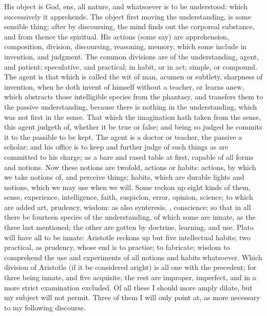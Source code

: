 {His object is God, ens, all nature, and whatsoever is to be understood:
which successively it apprehends. The object first moving the
understanding, is some sensible thing; after by discoursing, the mind
finds out the corporeal substance, and from thence the spiritual. His
actions (some say) are apprehension, composition, division,
discoursing, reasoning, memory, which some include in invention, and
judgment. The common divisions are of the understanding, agent, and
patient; speculative, and practical; in habit, or in act; simple, or
compound. The agent is that which is called the wit of man, acumen or
subtlety, sharpness of invention, when he doth invent of himself
without a teacher, or learns anew, which abstracts those intelligible
species from the phantasy, and transfers them to the passive
understanding, because there is nothing in the understanding,
which was not first in the sense. That which the imagination hath taken
from the sense, this agent judgeth of, whether it be true or false; and
being so judged he commits it to the passible to be kept. The agent is
a doctor or teacher, the passive a scholar; and his office is to keep
and further judge of such things as are committed to his charge; as a
bare and rased table at first, capable of all forms and notions. Now
these notions are twofold, actions or habits: actions, by which we take
notions of, and perceive things; habits, which are durable lights and
notions, which we may use when we will. Some reckon up eight kinds of
them, sense, experience, intelligence, faith, suspicion, error,
opinion, science; to which are added art, prudency, wisdom: as also
synteresis, , conscience; so that in all there
be fourteen species of the understanding, of which some are innate, as
the three last mentioned; the other are gotten by doctrine, learning,
and use. Plato will have all to be innate: Aristotle reckons up but
five intellectual habits; two practical, as prudency, whose end is to
practise; to fabricate; wisdom to comprehend the use and experiments of
all notions and habits whatsoever. Which division of Aristotle (if it
be considered aright) is all one with the precedent; for three being
innate, and five acquisite, the rest are improper, imperfect, and in a
more strict examination excluded. Of all these I should more amply
dilate, but my subject will not permit. Three of them I will only point
at, as more necessary to my following discourse.

}
